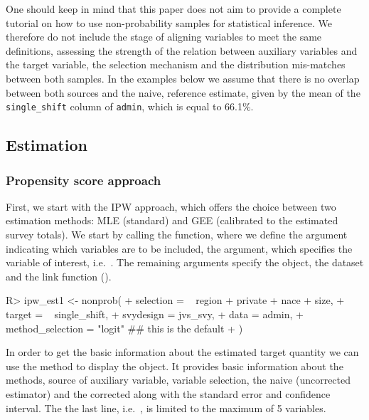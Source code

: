\documentclass[
]{jss}
\begin{document}
One should keep in mind that this paper does not aim to provide a
complete tutorial on how to use non-probability samples for statistical
inference. We therefore do not include the stage of aligning variables
to meet the same definitions, assessing the strength of the relation
between auxiliary variables and the target variable, the selection
mechanism and the distribution mis-matches between both samples. In the
examples below we assume that there is no overlap between both sources
and the naive, reference estimate, given by the mean of the
\texttt{single\_shift} column of \texttt{admin}, which is equal to
66.1\%.

\subsection{Estimation}\label{estimation}

\subsubsection{Propensity score
approach}\label{propensity-score-approach}

First, we start with the IPW approach, which offers the choice between
two estimation methods: MLE (standard) and GEE (calibrated to the
estimated survey totals). We start by calling the 
function, where we define the  argument indicating which
variables are to be included, the  argument, which
specifies the variable of interest, i.e.~. The
remaining arguments specify the  object, the dataset and
the link function ().

\begin{CodeChunk}
\begin{CodeInput}
R> ipw_est1 <- nonprob(
+   selection = ~ region + private + nace + size,
+   target = ~ single_shift,
+   svydesign = jvs_svy,
+   data = admin,
+   method_selection = "logit" ## this is the default
+ )
\end{CodeInput}
\end{CodeChunk}

In order to get the basic information about the estimated target
quantity we can use the  method to display the object. It
provides basic information about the methods, source of auxiliary
variable, variable selection, the naive (uncorrected estimator) and the
corrected along with the standard error and confidence interval. The the
last line, i.e.~, is limited to the maximum of
5 variables.
\end{document}
